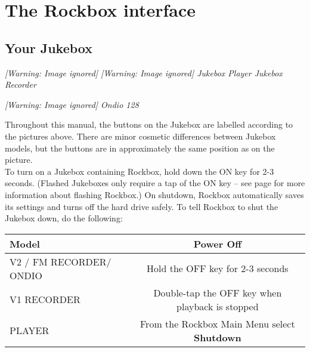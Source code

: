 \chapter{\label{ref:PARTII}The Rockbox interface}
\section{Your Jukebox}
\begin{minipage}{16.554cm}
{\centering\itshape
  [Warning: Image ignored] %
   [Warning: Image ignored] %
 \newline
Jukebox Player  Jukebox Recorder
\par}

{\centering\itshape
  [Warning: Image ignored] %
 \newline
Ondio 128
\par}
\end{minipage}

Throughout this manual, the buttons on the Jukebox are labelled
according to the pictures above.  There are minor cosmetic differences
between Jukebox models, but the buttons are in approximately the same
position as on the picture.\\

To turn on a Jukebox containing Rockbox, hold down the ON key
for 2{}-3 seconds.  (Flashed Jukeboxes only require a tap of the ON key
{--} see page \textup{\pageref{ref:FlashingRockboxReal}} for more
information about flashing Rockbox.) 
\label{ref:Safeshutdown}On shutdown, Rockbox automatically saves its settings and turns off the hard drive safely. To tell Rockbox to shut the Jukebox down, do the following:


\begin{table}[h!]
  \begin{center}
    \begin{tabular}{@{}lc@{}}\toprule
      \textbf{Model} & \textbf{Power Off} \\\midrule
      V2 / FM RECORDER/ ONDIO & Hold  the OFF key for 2{}-3 seconds \\
      V1 RECORDER & Double{}-tap the OFF key when playback is stopped \\
      PLAYER & From the Rockbox Main Menu select \textbf{Shutdown} \\\bottomrule
    \end{tabular}
  \end{center}
\end{table}

